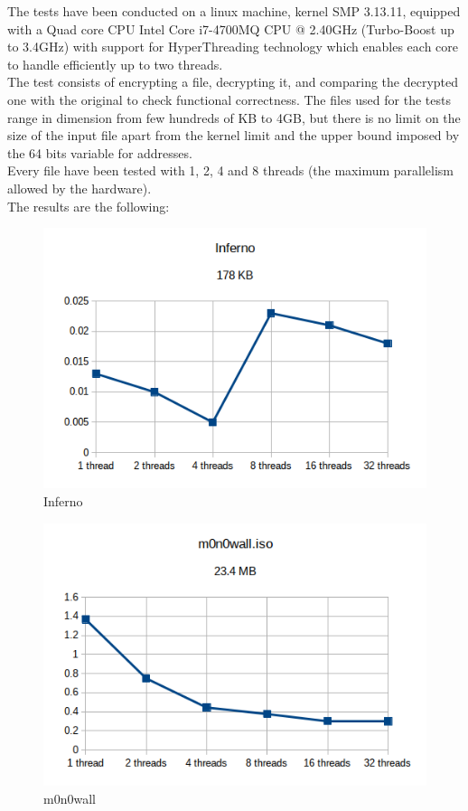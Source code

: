 The tests have been conducted on a linux machine, kernel SMP 3.13.11, equipped with a Quad core CPU Intel Core i7-4700MQ CPU @ 2.40GHz (Turbo-Boost up to 3.4GHz) with support for HyperThreading technology which enables each core to handle efficiently up to two threads.\\
The test consists of encrypting a file, decrypting it, and comparing the decrypted one with the original to check functional correctness. The files used for the tests range in dimension from few hundreds of KB to 4GB, but there is no limit on the size of the input file apart from the kernel limit and the upper bound imposed by the 64 bits variable for addresses.\\
Every file have been tested with 1, 2, 4 and 8 threads (the maximum parallelism allowed by the hardware).\\
The results are the following:

\begin{figure}[H]
\centering
\includegraphics[scale = 0.8]{./Pictures/Inferno} %
\caption{Inferno}
\label{fig:Inferno}
\end{figure}

\begin{figure}[H]
\centering
\includegraphics[scale = 0.8]{./Pictures/m0n0wall} %
\caption{m0n0wall}
\label{fig:m0n0wall}
\end{figure}

